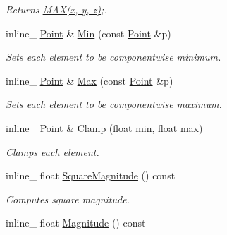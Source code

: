 \begin{DoxyCompactItemize}
\begin{DoxyCompactList}\small\item\em Returns \hyperlink{IceTypes_8h_afa99ec4acc4ecb2dc3c2d05da15d0e3f}{M\+A\+X(x, y, z)};. \end{DoxyCompactList}\item 
inline\+\_\+ \hyperlink{classOpcode_1_1Point}{Point} \& \hyperlink{classOpcode_1_1Point_aef241365aa8e680c825769ff274d612b}{Min} (const \hyperlink{classOpcode_1_1Point}{Point} \&p)\hypertarget{classOpcode_1_1Point_aef241365aa8e680c825769ff274d612b}{}\label{classOpcode_1_1Point_aef241365aa8e680c825769ff274d612b}

\begin{DoxyCompactList}\small\item\em Sets each element to be componentwise minimum. \end{DoxyCompactList}\item 
inline\+\_\+ \hyperlink{classOpcode_1_1Point}{Point} \& \hyperlink{classOpcode_1_1Point_a6369e10086f84cab5a3b7f943315dfb6}{Max} (const \hyperlink{classOpcode_1_1Point}{Point} \&p)\hypertarget{classOpcode_1_1Point_a6369e10086f84cab5a3b7f943315dfb6}{}\label{classOpcode_1_1Point_a6369e10086f84cab5a3b7f943315dfb6}

\begin{DoxyCompactList}\small\item\em Sets each element to be componentwise maximum. \end{DoxyCompactList}\item 
inline\+\_\+ \hyperlink{classOpcode_1_1Point}{Point} \& \hyperlink{classOpcode_1_1Point_a6ce43e457b9d1f0e8b9bc5fff5f465c1}{Clamp} (float min, float max)\hypertarget{classOpcode_1_1Point_a6ce43e457b9d1f0e8b9bc5fff5f465c1}{}\label{classOpcode_1_1Point_a6ce43e457b9d1f0e8b9bc5fff5f465c1}

\begin{DoxyCompactList}\small\item\em Clamps each element. \end{DoxyCompactList}\item 
inline\+\_\+ float \hyperlink{classOpcode_1_1Point_ad63f654f9acf044079178f45f3198435}{Square\+Magnitude} () const \hypertarget{classOpcode_1_1Point_ad63f654f9acf044079178f45f3198435}{}\label{classOpcode_1_1Point_ad63f654f9acf044079178f45f3198435}

\begin{DoxyCompactList}\small\item\em Computes square magnitude. \end{DoxyCompactList}\item 
inline\+\_\+ float \hyperlink{classOpcode_1_1Point_a05debc6d2d8a2049b1617a0608d39fb1}{Magnitude} () const \hypertarget{classOpcode_1_1Point_a05debc6d2d8a2049b1617a0608d39fb1}{}\label{classOpcode_1_1Point_a05debc6d2d8a2049b1617a0608d39fb1}


\end{DoxyCompactItemize}
